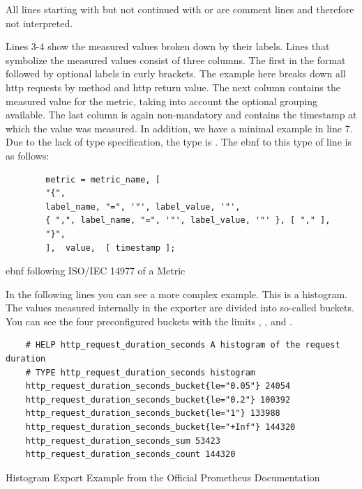 All lines starting with \promcode{#} but not continued with  or  are comment lines and therefore not interpreted.

Lines 3-4 show the measured values broken down by their labels. Lines that symbolize the measured values consist of three columns. The first in the format  followed by optional labels in curly brackets. The example here breaks down all \gls{http} requests by method and \gls{http} return value. The next column contains the measured value for the metric, taking into account the optional grouping available. The last column is again non-mandatory and contains the timestamp at which the value was measured. 
In addition, we have a minimal example in line 7. Due to the lack of type specification, the type is . The \gls{ebnf} to this type of line is as follows:
\begin{listing}[H]
	\begin{samepage}
		\begin{verbatim}
		metric = metric_name, [ 
		"{",
		label_name, "=", '"', label_value, '"',
		{ ",", label_name, "=", '"', label_value, '"' }, [ "," ], 
		"}",
		],  value,  [ timestamp ];
		\end{verbatim}
		\caption{\gls{ebnf} following ISO/IEC 14977 of a Metric}
	\end{samepage}
\end{listing}

In the following lines you can see a more complex example. This is a histogram. The values measured internally in the exporter are divided into so-called buckets. You can see the four preconfigured buckets with the limits , ,  and . 
\begin{listing}[H]
	\begin{verbatim}
	# HELP http_request_duration_seconds A histogram of the request duration
	# TYPE http_request_duration_seconds histogram
	http_request_duration_seconds_bucket{le="0.05"} 24054
	http_request_duration_seconds_bucket{le="0.2"} 100392
	http_request_duration_seconds_bucket{le="1"} 133988
	http_request_duration_seconds_bucket{le="+Inf"} 144320
	http_request_duration_seconds_sum 53423
	http_request_duration_seconds_count 144320
	\end{verbatim}
	\caption{Histogram Export Example from the Official Prometheus Documentation~\cite{PrometheusExpositionFormatBeispiel}}
\end{listing}

